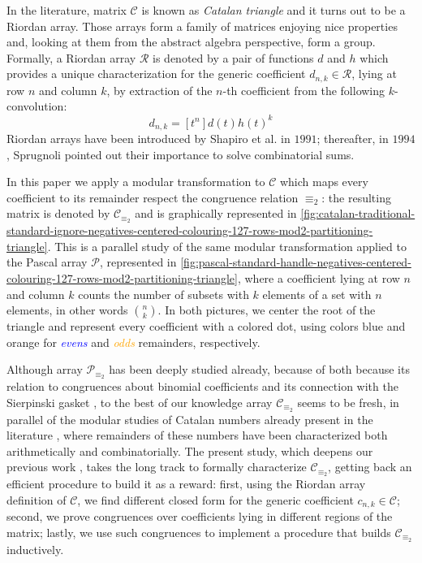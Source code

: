 In the literature, matrix $\mathcal{C}$ is known as \emph{Catalan triangle} and
it turns out to be a Riordan array. Those arrays form a family of matrices enjoying
nice properties and, looking at them from the abstract algebra perspective, form a group. 
Formally, a Riordan array $\mathcal{R}$ is denoted by a pair of functions $d$ and $h$ which provides a unique 
characterization for the generic coefficient $d_{n,k}\in\mathcal{R}$, lying at row $n$ and column $k$, 
by extraction of the $n$-th coefficient from the following $k$-convolution:
\begin{equation}
    d_{n,k} = [t^{n}]d(t)h(t)^{k}
    \label{eq:Riordan:array:coefficient}
\end{equation}
Riordan arrays have been introduced by Shapiro et al. \cite{shapiro:1991} in $1991$;
thereafter, in $1994$, Sprugnoli \cite{sprugnoli:1991} pointed out their importance
to solve combinatorial sums.

In this paper we apply a modular transformation to $\mathcal{C}$ which maps every coefficient 
to its remainder respect the congruence relation $\equiv_{2}$: the resulting matrix is 
denoted by $\mathcal{C}_{\equiv_{2}}$ and is graphically represented in 
\autoref{fig:catalan-traditional-standard-ignore-negatives-centered-colouring-127-rows-mod2-partitioning-triangle}.
This is a parallel study of the same modular transformation applied to the Pascal array $\mathcal{P}$,
represented in \autoref{fig:pascal-standard-handle-negatives-centered-colouring-127-rows-mod2-partitioning-triangle},
where a coefficient lying at row $n$ and column $k$ counts the number of subsets
with $k$ elements of a set with $n$ elements, in other words ${{n}\choose{k}}$.
In both pictures, we center the root of the triangle and represent every coefficient 
with a colored dot, using colors blue and orange 
for \textcolor{blue}{\emph{evens}} and \textcolor{orange}{\emph{odds}} remainders, respectively. 

Although array $\mathcal{P}_{\equiv_{2}}$ has been deeply studied already,
because of both because its relation to congruences about binomial coefficients
and its connection with the Sierpinski gasket \cite{sokolov,
stewart:four:encounters:sierpinski}, to the best of our knowledge array
$\mathcal{C}_{\equiv_{2}}$ seems to be fresh, in parallel of the modular
studies of Catalan numbers already present in the literature
\cite{alter:kubota:prime:power:catalan:divisibility,
egecioglu:parity:via:lattice:paths,
konvalinka:divisibility:generalized:catalan:numbers}, where remainders of these
numbers have been characterized both arithmetically and combinatorially.  The
present study, which deepens our previous work \cite{merlini:nocentini:lecco},
takes the long track to formally characterize $\mathcal{C}_{\equiv_{2}}$,
getting back an efficient procedure to build it as a reward: first, using the
Riordan array definition of $\mathcal{C}$, we find different closed form for
the generic coefficient $c_{n,k}\in\mathcal{C}$; second, we prove congruences
over coefficients lying in different regions of the matrix; lastly, we use such
congruences to implement a procedure that builds $\mathcal{C}_{\equiv_{2}}$
inductively. 

